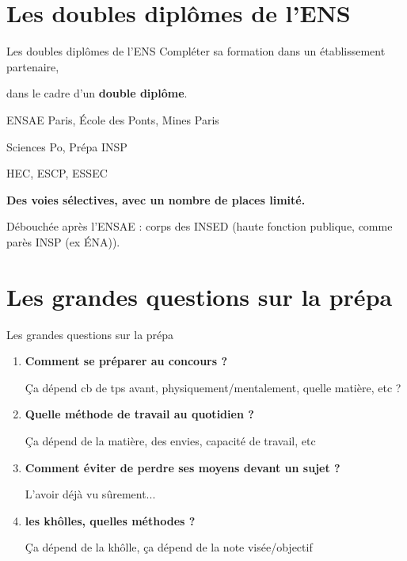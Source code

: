 \documentclass[11pt,aspectratio=169]{beamer}
\begin{document}
\section{Les doubles diplômes de l'ENS}
\begin{frame}{Les doubles diplômes de l'ENS}
  Compléter sa formation dans un établissement partenaire,\par
  dans le cadre d'un \textbf{double diplôme}.
  \vspace{6mm}
  \begin{description}
    \setlength{\itemsep}{4mm}
    \item[Ingénierie et statistiques] ENSAE Paris, École des Ponts, Mines Paris
    \item[Affaires publiques] Sciences Po, Prépa INSP
    \item[Management] HEC, ESCP, ESSEC
  \end{description}
  \vspace{6mm}
  \textbf{Des voies sélectives, avec un nombre de places limité.}\par
  \medskip
  \small
  Débouchée après l'ENSAE : corps des INSED (haute fonction publique, comme parès INSP (ex ÉNA)).
\end{frame}

\section{Les grandes questions sur la prépa}
\begin{frame}{Les grandes questions sur la prépa}
  \begin{enumerate}
    \setlength{\itemsep}{4mm}
    \item \textbf{Comment se préparer au concours ?}\par
          Ça dépend cb de tps avant, physiquement/mentalement, quelle matière, etc ?
    \item \textbf{Quelle méthode de travail au quotidien ?}\par
          Ça dépend de la matière, des envies, capacité de travail, etc 
    \item \textbf{Comment éviter de perdre ses moyens devant un sujet ?}\par
          L'avoir déjà vu sûrement...
    \item \textbf{les khôlles, quelles méthodes ?}\par
          Ça dépend de la khôlle, ça dépend de la note visée/objectif
  \end{enumerate}
\end{frame}
\end{document}
